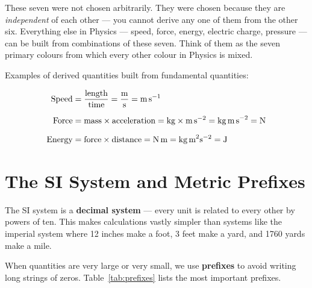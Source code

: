 \begin{realworldbox}
These seven were not chosen arbitrarily. They were chosen
because they are \textit{independent} of each other --- you
cannot derive any one of them from the other six. Everything
else in Physics --- speed, force, energy, electric charge,
pressure --- can be built from combinations of these seven.
Think of them as the seven primary colours from which every
other colour in Physics is mixed.
\end{realworldbox}

Examples of derived quantities built from fundamental quantities:

\begin{align*}
  \text{Speed} &= \frac{\text{length}}{\text{time}}
  = \frac{\text{m}}{\text{s}} = \text{m\,s}^{-1}\\[6pt]
  \text{Force} &= \text{mass} \times \text{acceleration}
  = \text{kg} \times \text{m\,s}^{-2}
  = \text{kg\,m\,s}^{-2} = \text{N}\\[6pt]
  \text{Energy} &= \text{force} \times \text{distance}
  = \text{N\,m} = \text{kg\,m}^2\text{s}^{-2} = \text{J}
\end{align*}

\section{The SI System and Metric Prefixes}
\label{sec:si_prefixes}

The SI system is a \textbf{decimal system} --- every unit
is related to every other by powers of ten. This makes
calculations vastly simpler than systems like the imperial
system where 12 inches make a foot, 3 feet make a yard, and
1760 yards make a mile.

When quantities are very large or very small, we use
\textbf{prefixes} to avoid writing long strings of zeros.
Table~\ref{tab:prefixes} lists the most important prefixes.

